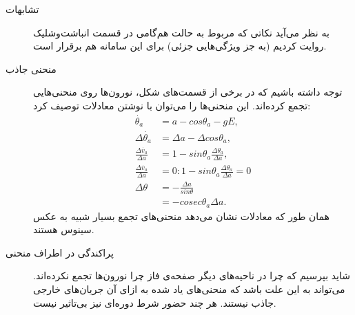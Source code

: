 \begin{description}
	\item[تشابهات]
	به نظر می‌آید نکاتی که مربوط به حالت هم‌گامی در قسمت انباشت‌وشلیک روایت کردیم (به جز ویژگی‌هایی جزئی) برای این سامانه هم برقرار است. 
	\item[منحنی جاذب] 
	توجه داشته باشیم که در برخی از قسمت‌های شکل، نورون‌ها روی منحنی‌هایی تجمع کرده‌اند. این منحنی‌ها را می‌توان با نوشتن معادلات توصیف کرد:
	 \begin{align}
		\dot{\theta_a} &= a - cos\theta_a - g E ,\\
		\Delta\dot{\theta_a} &= \Delta a - \Delta cos\theta_a ,\\
		\frac{\Delta\dot{v_a}}{\Delta a} &= 1 - sin\theta_a\frac{\Delta \theta_a}{\Delta a},\\
		\frac{\Delta\dot{v_a}}{\Delta a} &= 0 : 1 - sin\theta_a\frac{\Delta \theta_a}{\Delta a} = 0\\
		\Delta \theta &= - \frac{\Delta a}{sin\theta}\\
		&= - cosec\theta_a \Delta a.
	\end{align}
همان طور که معادلات نشان می‌دهد منحنی‌های تجمع بسیار شبیه به عکس سینوس هستند. 
	\item[پراکندگی در اطراف منحنی]
	شاید بپرسیم که چرا در ناحیه‌های دیگر صفحه‌ی فاز چرا نورون‌ها تجمع نکرده‌اند. می‌تواند به این علت باشد که منحنی‌های یاد شده به ازای آن جریان‌های خارجی جاذب نیستند. هر چند حضور شرط دوره‌ای نیز بی‌تاثیر نیست.
\end{description}


